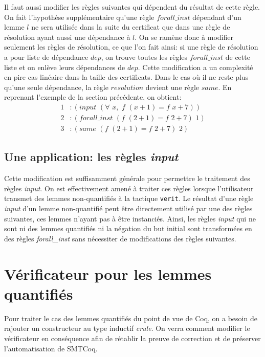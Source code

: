 \documentclass[11pt]{article}
\begin{document}
Il faut aussi modifier les règles suivantes qui dépendent du résultat de cette règle. On fait l'hypothèse supplémentaire qu'une règle $forall\_inst$ dépendant d'un lemme $l$ ne sera utilisée dans la suite du certificat que dans une règle de résolution ayant aussi une dépendance à $l$. On se ramène donc à modifier seulement les règles de résolution, ce que l'on fait ainsi: si une règle de résolution a pour liste de dépendance $dep$, on trouve toutes les règles $forall\_inst$ de cette liste et on enlève leurs dépendances de $dep$. Cette modification a un complexité en pire cas linéaire dans la taille des certificats. Dans le cas où il ne reste plus qu'une seule dépendance, la règle $resolution$ devient une règle $same$. En reprenant l'exemple de la section précédente, on obtient: 
\begin{align*}
1&:(input\,\, (\forall \,\,x, \,\, f \,\,(x+1) = f\,\,x + 7)) \\
2&:(forall\_inst \,\,(f\,\, (2+1) = f\,\,2 + 7) \,\,1) \\
3&:(same\,\, (f\,\,(2+1) = f\,\,2 + 7) \,\,2) 
\end{align*}

\subsection{Une application: les règles \textit{input}}

Cette modification est suffisamment générale pour permettre le traitement des règles \textit{input}. On est effectivement amené à traiter ces règles lorsque l'utilisateur transmet des lemmes non-quantifiés à la tactique \texttt{verit}. Le résultat d'une règle \textit{input} d'un lemme non-quantifié peut être directement utilisé par une des règles suivantes, ces lemmes n'ayant pas à être instanciés. Ainsi, les règles \textit{input} qui ne sont ni des lemmes quantifiés ni la négation du but initial sont transformées en des règles \textit{forall\_inst} sans nécessiter de modifications des règles suivantes.

\newpage
\section{Vérificateur pour les lemmes quantifiés} \label{instanciations}

Pour traiter le cas des lemmes quantifiés du point de vue de Coq, on a besoin de rajouter un constructeur au type inductif \textit{crule}. On verra comment modifier le vérificateur en conséquence afin de rétablir la preuve de correction et de préserver l'automatisation de SMTCoq.
\end{document}
